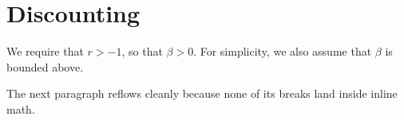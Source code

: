 \section{Discounting}

We require that $r > -1$, so that $\beta
> 0$.  For simplicity, we also assume that $\beta$ is bounded above.

The next paragraph reflows cleanly because none of its breaks land inside
inline math.
